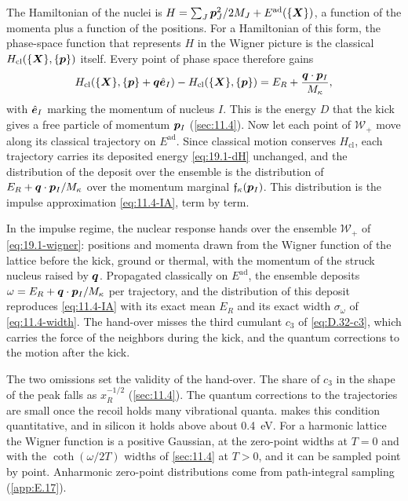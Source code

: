 The Hamiltonian of the nuclei is $H = \sum_J\bm{p}_J^2/2M_J + E^{\mathrm{ad}}(\{\bm{X}\})$, a function of the momenta plus a function of the positions. For a Hamiltonian of this form, the phase-space function that represents $H$ in the Wigner picture is the classical $H_{\mathrm{cl}}(\{\bm{X}\},\{\bm{p}\})$ itself. Every point of phase space therefore gains
\begin{equation}
  H_{\mathrm{cl}}(\{\bm{X}\},\{\bm{p}\} + \bm{q}\hat{\bm{e}}_I) - H_{\mathrm{cl}}(\{\bm{X}\},\{\bm{p}\}) = E_R + \frac{\bm{q}\cdot\bm{p}_I}{M_\kappa} ,
  \label{eq:19.1-dH}
\end{equation}
with $\hat{\bm{e}}_I$ marking the momentum of nucleus $I$. This is the energy $D$ that the kick gives a free particle of momentum $\bm{p}_I$ (\cref{sec:11.4}). Now let each point of $\mathcal{W}_+$ move along its classical trajectory on $E^{\mathrm{ad}}$. Since classical motion conserves $H_{\mathrm{cl}}$, each trajectory carries its deposited energy \cref{eq:19.1-dH} unchanged, and the distribution of the deposit over the ensemble is the distribution of $E_R + \bm{q}\cdot\bm{p}_I/M_\kappa$ over the momentum marginal $\mathfrak{f}_\kappa(\bm{p}_I)$. This distribution is the impulse approximation \cref{eq:11.4-IA}, term by term.
\begin{keyresult}
In the impulse regime, the nuclear response hands over the ensemble $\mathcal{W}_+$ of \cref{eq:19.1-wigner}: positions and momenta drawn from the Wigner function of the lattice before the kick, ground or thermal, with the momentum of the struck nucleus raised by $\bm{q}$. Propagated classically on $E^{\mathrm{ad}}$, the ensemble deposits $\omega = E_R + \bm{q}\cdot\bm{p}_I/M_\kappa$ per trajectory, and the distribution of this deposit reproduces \cref{eq:11.4-IA} with its exact mean $E_R$ and its exact width $\sigma_\omega$ of \cref{eq:11.4-width}. The hand-over misses the third cumulant $c_3$ of \cref{eq:D.32-c3}, which carries the force of the neighbors during the kick, and the quantum corrections to the motion after the kick.
\end{keyresult}
\noindent The two omissions set the validity of the hand-over. The share of $c_3$ in the shape of the peak falls as $x_R^{-1/2}$ (\cref{sec:11.4}). The quantum corrections to the trajectories are small once the recoil holds many vibrational quanta.  makes this condition quantitative, and in silicon it holds above about \SI{0.4}{eV}. For a harmonic lattice the Wigner function is a positive Gaussian, at the zero-point widths at $T = 0$ and with the $\coth(\omega/2T)$ widths of \cref{sec:11.4} at $T > 0$, and it can be sampled point by point. Anharmonic zero-point distributions come from path-integral sampling (\cref{app:E.17}).

